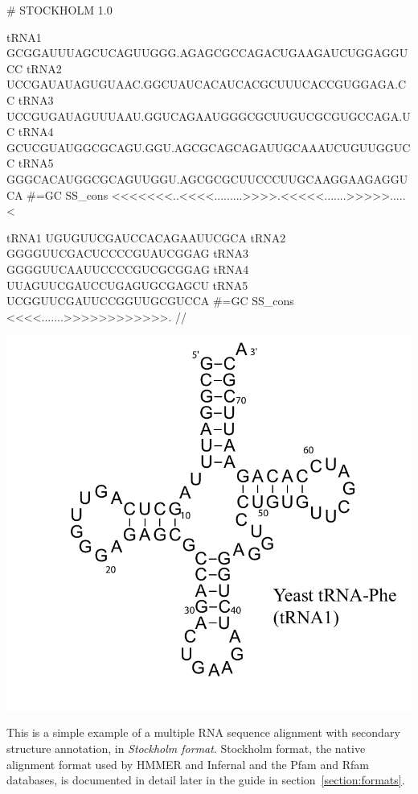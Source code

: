 \vspace{1em}
\begin{minipage}{4.0in}
\begin{sreoutput}[xleftmargin=0em]
# STOCKHOLM 1.0

tRNA1             GCGGAUUUAGCUCAGUUGGG.AGAGCGCCAGACUGAAGAUCUGGAGGUCC
tRNA2             UCCGAUAUAGUGUAAC.GGCUAUCACAUCACGCUUUCACCGUGGAGA.CC
tRNA3             UCCGUGAUAGUUUAAU.GGUCAGAAUGGGCGCUUGUCGCGUGCCAGA.UC
tRNA4             GCUCGUAUGGCGCAGU.GGU.AGCGCAGCAGAUUGCAAAUCUGUUGGUCC
tRNA5             GGGCACAUGGCGCAGUUGGU.AGCGCGCUUCCCUUGCAAGGAAGAGGUCA
#=GC SS_cons      <<<<<<<..<<<<.........>>>>.<<<<<.......>>>>>.....<

tRNA1             UGUGUUCGAUCCACAGAAUUCGCA
tRNA2             GGGGUUCGACUCCCCGUAUCGGAG
tRNA3             GGGGUUCAAUUCCCCGUCGCGGAG
tRNA4             UUAGUUCGAUCCUGAGUGCGAGCU
tRNA5             UCGGUUCGAUUCCGGUUGCGUCCA
#=GC SS_cons      <<<<.......>>>>>>>>>>>>.
//
\end{sreoutput}
\end{minipage}
\begin{minipage}{1.5in}
\includegraphics[scale=0.4]{Figures/trna1-DF6280}
\end{minipage}
\vspace{1em}

This is a simple example of a multiple RNA sequence alignment with
secondary structure annotation, in \emph{Stockholm format}.  Stockholm
format, the native alignment format used by HMMER and Infernal and the
Pfam and Rfam databases, is documented in detail later in the guide in
section~\ref{section:formats}.

